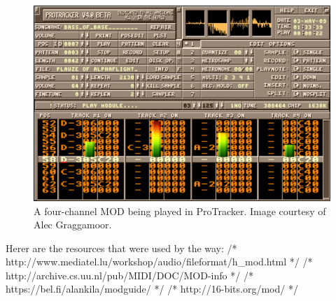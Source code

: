 \begin{figure}[h]
\includegraphics[width = \textwidth]{images/Protracker.png}
\caption{A four-channel MOD being played in ProTracker. Image courtesy of Alec Graggamoor.}
\label{img-protracker}
\end{figure}

Herer are the resources that were used by the way:
/* http://www.mediatel.lu/workshop/audio/fileformat/h_mod.html */
/* http://archive.cs.uu.nl/pub/MIDI/DOC/MOD-info */
/* https://bel.fi/alankila/modguide/ */
/* http://16-bits.org/mod/ */

\newpage


